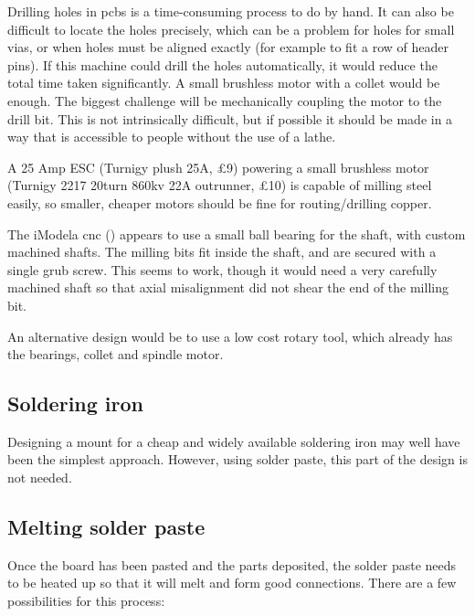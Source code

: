 Drilling holes in pcbs is a time-consuming process to do by hand. It can also be difficult to locate the holes precisely, which can be a problem
for holes for small vias, or when holes must be aligned exactly (for example to fit a row of header pins). If this machine could drill the holes automatically,
it would reduce the total time taken significantly. A small brushless motor with a collet would be enough. The biggest challenge
will be mechanically coupling the motor to the drill bit. This is not intrinsically difficult, but if possible it should be made in a way that
is accessible to people without the use of a lathe.

A 25 Amp ESC (Turnigy plush 25A, \pounds 9) powering a small brushless motor (Turnigy 2217 20turn 860kv 22A outrunner, \pounds 10) is capable of milling
steel easily, so smaller, cheaper motors should be fine for routing/drilling copper.

The iModela cnc (\cite{imodela}) appears to use a small ball bearing for the shaft, with custom machined shafts. The milling bits fit inside the shaft, and
are secured with a single grub screw. This seems to work, though it would need a very carefully machined shaft so that axial misalignment
did not shear the end of the milling bit.

An alternative design would be to use a low cost rotary tool, which already has the bearings, collet and spindle motor. 

\subsection{Soldering iron}
Designing a mount for a cheap and widely available soldering iron may well have been the simplest approach. However, using solder paste, 
this part of the design is not needed.

\subsection{Melting solder paste}
Once the board has been pasted and the parts deposited, the solder paste needs to be heated up so that it will melt and form good connections.
There are a few possibilities for this process:

